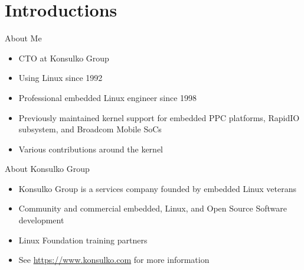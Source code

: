 \section{Introductions}

\begin{frame}
	{About Me}

	\begin{itemize}
		\item
			CTO at Konsulko Group
		\item
			Using Linux since 1992
		\item
			Professional embedded Linux engineer since 1998
		\item
			Previously maintained kernel support for embedded PPC platforms, RapidIO subsystem, and Broadcom Mobile SoCs
		\item
			Various contributions around the kernel
	\end{itemize}

\end{frame}


\begin{frame}
	{About Konsulko Group}
	\begin{itemize}
		\item
			Konsulko Group is a services company founded by embedded Linux veterans
		\item
			Community and commercial embedded, Linux, and Open Source Software development
		\item
			Linux Foundation training partners
		\item
			See \url{https://www.konsulko.com} for more information
	\end{itemize}
\end{frame}
